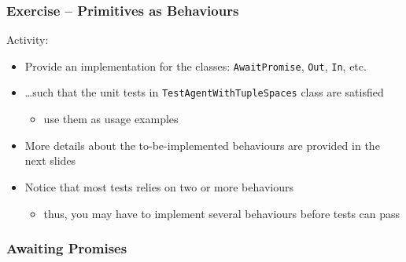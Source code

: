 \documentclass[presentation]{beamer}\mode<presentation>{\usetheme{AMSCesenaPurpleAndGold}}
\begin{document}
\begin{frame}[allowframebreaks]
	\frametitle{Exercise \currentExercise{} -- \linda{} Primitives as Behaviours}

	Activity:
	\bigskip
	\begin{itemize}

		\item Provide an implementation for the classes: \texttt{AwaitPromise}, \texttt{Out}, \texttt{In}, etc.

		\bigskip

		\item \ldots such that the \alert{unit tests} in \alert{\texttt{TestAgentWithTupleSpaces}} class are satisfied
		\begin{itemize}
			\item use them as usage examples
		\end{itemize}

		\bigskip

		\item More details about the to-be-implemented behaviours are provided in the next slides

		\bigskip

		\item Notice that most tests relies on two or more behaviours
		\begin{itemize}
			\item thus, you may have to implement several behaviours before tests can pass
		\end{itemize}
	\end{itemize}

\end{frame}

\subsubsection{Awaiting Promises}
\end{document}
